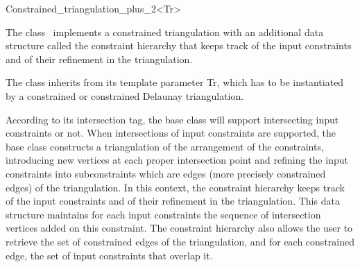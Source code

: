 

\begin{ccRefClass}{Constrained_triangulation_plus_2<Tr>}  %


The class \ccRefName\ 
implements a constrained triangulation 
with an additional data
structure called the  constraint hierarchy 
that keeps track of  the input constraints and of their refinement
in the triangulation.

The class 
inherits from its template parameter Tr, which has to be instantiated
by a constrained or constrained Delaunay  triangulation.

According to its intersection tag, the base class
will support intersecting input constraints or not.
When intersections of input constraints are supported,
the base class constructs a triangulation  of the  arrangement
of the constraints,
introducing new vertices at each proper intersection
point and  refining the input constraints into subconstraints
which are edges (more precisely constrained edges) of the
triangulation. 
In this context, the constraint hierarchy 
keeps track of  the input constraints and of their refinement
in the triangulation. This data structure 
maintains for each input constraints 
the sequence of intersection vertices added on this constraint.
The constraint hierarchy also allows the user to retrieve the set
of constrained edges of the triangulation, and for each
constrained edge,  the set of input constraints that overlap it.


\ccInheritsFrom
{}

\ccTypes 
{}
\ccGlue
{}


\end{ccRefClass}
